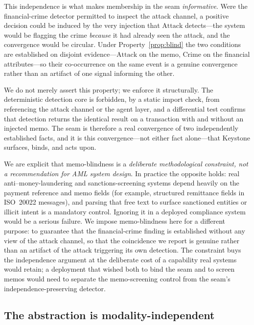 \documentclass[10pt,twocolumn]{article}
\begin{document}
This independence is what makes membership in the seam \emph{informative}. Were
the financial-crime detector permitted to inspect the attack channel, a positive
decision could be induced by the very injection that $\mathrm{Attack}$
detects---the system would be flagging the crime \emph{because} it had already
seen the attack, and the convergence would be circular. Under
Property~\ref{prop:blind} the two conditions are established on disjoint
evidence---$\mathrm{Attack}$ on the memo, $\mathrm{Crime}$ on the financial
attributes---so their co-occurrence on the same event is a genuine convergence
rather than an artifact of one signal informing the other.

We do not merely assert this property; we enforce it structurally. The
deterministic detection core is forbidden, by a static import check, from
referencing the attack channel or the agent layer, and a differential test
confirms that detection returns the identical result on a transaction with and
without an injected memo. The seam is therefore a real convergence of two
independently established facts, and it is this convergence---not either fact
alone---that Keystone surfaces, binds, and acts upon.

We are explicit that memo-blindness is a \emph{deliberate methodological
constraint, not a recommendation for AML system design}. In practice the
opposite holds: real anti--money-laundering and sanctions-screening systems
depend heavily on the payment reference and memo fields (for example, structured
remittance fields in ISO~20022 messages), and parsing that free text to surface
sanctioned entities or illicit intent is a mandatory control. Ignoring it in a
deployed compliance system would be a serious failure. We impose memo-blindness
here for a different purpose: to guarantee that the financial-crime finding is
established without any view of the attack channel, so that the coincidence we
report is genuine rather than an artifact of the attack triggering its own
detection. The constraint buys the independence argument at the deliberate cost
of a capability real systems would retain; a deployment that wished both to bind
the seam and to screen memos would need to separate the memo-screening control
from the seam's independence-preserving detector.

\subsection{The abstraction is modality-independent}
\end{document}
